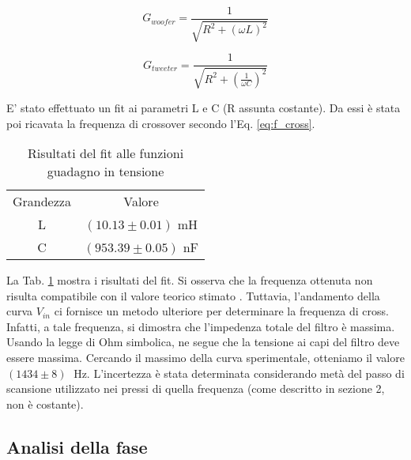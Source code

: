 \documentclass[../Relazione_circuiti]{subfiles}
\begin{document}
  \begin{equation}
    \label{eq:gain_woofer}
    G_{woofer} = \frac{1}{\sqrt{R^2+(\omega L)^2}}
  \end{equation}

  \begin{equation}
    \label{eq:gain_tweeter}
    G_{tweeter} = \frac{1}{\sqrt{R^2+(\frac{1}{\omega C})^2}}
  \end{equation}



  E' stato effettuato un fit ai parametri L e C (R assunta costante). Da essi è stata poi ricavata la frequenza di
  crossover secondo l'Eq. \eqref{eq:f_cross}.

  \begin{table}
    \centering

    \begin{tabular}{c | c }

      Grandezza & Valore                 \\

      L         & $(10.13 \pm 0.01)$ mH  \\
      C         & $(953.39 \pm 0.05)$ nF

    \end{tabular}

    \caption{Risultati del fit alle funzioni guadagno in tensione}
    \label{tab:fit_amplitude}

  \end{table}

  La Tab. \ref{tab:fit_amplitude} mostra i risultati del fit.
  Si osserva che la frequenza ottenuta non risulta compatibile con il valore teorico stimato \theoryF.
  Tuttavia, l'andamento della curva $V_{in}$ ci fornisce un metodo ulteriore per determinare la frequenza di cross.
  Infatti, a tale frequenza, si dimostra che l'impedenza totale del filtro è massima.
  Usando la legge di Ohm simbolica, ne segue che la tensione ai capi del filtro deve essere massima.
  Cercando il massimo della curva sperimentale, otteniamo il valore $(1434 \pm 8) \;$ Hz.
  L'incertezza è stata determinata considerando metà del passo di scansione utilizzato nei pressi di quella frequenza
  (come descritto in sezione 2, non è costante).

\subsection{Analisi della fase}
\end{document}
